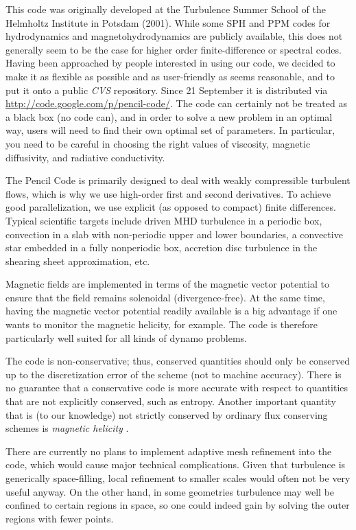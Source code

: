 \documentclass[\mydriver,12pt,twoside,notitlepage,a4paper]{article}
\makeatletter
\newcommand{\name}[2][]{%
  \def\index@{#1}%
  \textsl{#2\/}%
  \ifx\index@\@empty\index{#2@\MakeUppercase #2}%
  \else\index{#1}%
  \fi%
}
\makeatother
\begin{document}
This code was originally developed at the Turbulence Summer School of the
Helmholtz Institute in Potsdam (2001).
While some SPH and PPM codes for hydrodynamics and magnetohydrodynamics
are publicly available, this does not generally seem to be
the case for higher order finite-difference or spectral codes.
Having been approached by people interested in using our code, we
decided to make it as flexible as possible and as user-friendly as seems
reasonable, and to put it onto a public \name{CVS} repository.
Since 21 September it is distributed via
\url{http://code.google.com/p/pencil-code/}.
The code can certainly not be treated as a black box (no code can), and in
order to solve a new problem in an optimal way, users will need to find their
own optimal set of parameters.
In particular, you need to be careful in choosing
the right values of viscosity, magnetic diffusivity, and radiative
conductivity.

The {\sc Pencil Code} is primarily designed to deal with weakly compressible
turbulent flows, which is why we use high-order first and second derivatives.
To achieve good parallelization, we use explicit
(as opposed to compact) finite differences.
Typical scientific targets include driven MHD turbulence in a periodic box,
convection in a slab with non-periodic upper and lower boundaries,
a convective star embedded in a fully nonperiodic box, accretion disc
turbulence in the shearing sheet approximation, etc.

Magnetic fields are implemented in terms of the magnetic vector potential
to ensure that the field remains solenoidal (divergence-free).
At the same time, having the magnetic
vector potential readily available is a big advantage if
one wants to monitor the magnetic helicity, for example.
The code is therefore particularly well suited for all kinds of
dynamo problems.

The code is non-conservative; thus, conserved quantities should only be
conserved up to the discretization error of the scheme (not to machine
accuracy).
There is no guarantee that a conservative code is more accurate with
respect to quantities that are not explicitly conserved, such as entropy.
Another important quantity that is (to our knowledge) not strictly
conserved by ordinary flux conserving schemes is \name{magnetic helicity}.

There are currently no plans to implement adaptive mesh refinement
into the code, which would cause major technical complications.
Given that turbulence is generically space-filling, local refinement
to smaller scales would often not be very useful anyway.
On the other hand, in some geometries
turbulence may well be confined to certain regions in space, so one
could indeed gain by solving the outer regions with fewer points.
\end{document}
